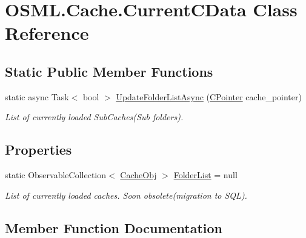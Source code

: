\hypertarget{classOSML_1_1Cache_1_1CurrentCData}{}\section{O\+S\+M\+L.\+Cache.\+Current\+C\+Data Class Reference}
\label{classOSML_1_1Cache_1_1CurrentCData}
\subsection*{Static Public Member Functions}
\begin{DoxyCompactItemize}
\item 
static async Task$<$ bool $>$ \mbox{\hyperlink{classOSML_1_1Cache_1_1CurrentCData_abb1203ad1bb754024aa1a8429d8793aa}{Update\+Folder\+List\+Async}} (\mbox{\hyperlink{classOSML_1_1Cache_1_1CPointer}{C\+Pointer}} cache\+\_\+pointer)
\begin{DoxyCompactList}\small\item\em List of currently loaded Sub\+Caches(\+Sub folders). \end{DoxyCompactList}\end{DoxyCompactItemize}
\subsection*{Properties}
\begin{DoxyCompactItemize}
\item 
static Observable\+Collection$<$ \mbox{\hyperlink{classOSML_1_1Cache_1_1CacheObj}{Cache\+Obj}} $>$ \mbox{\hyperlink{classOSML_1_1Cache_1_1CurrentCData_ab24556810039e9fa22209438cbf56023}{Folder\+List}} = null
\begin{DoxyCompactList}\small\item\em List of currently loaded caches. Soon obsolete(migration to S\+Q\+L). \end{DoxyCompactList}\end{DoxyCompactItemize}


\subsection{Member Function Documentation}
\mbox{\label{classOSML_1_1Cache_1_1CurrentCData_abb1203ad1bb754024aa1a8429d8793aa}} 
